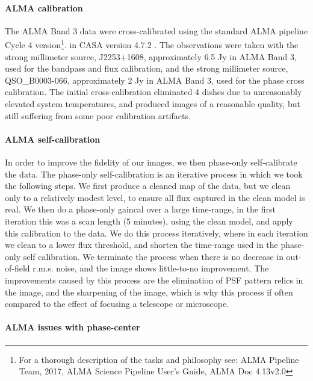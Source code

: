 \documentclass[twocolumn]{aastex62}
\begin{document}
\paragraph{ALMA calibration} The ALMA Band 3 data were cross-calibrated using the standard ALMA pipeline Cycle 4 version\footnote{For a thorough description of the tasks and philosophy see: ALMA Pipeline Team, 2017, ALMA Science Pipeline User’s Guide, ALMA Doc 4.13v2.0}. in CASA version 4.7.2 \citep{casa}. The observations were taken with the strong millimeter source, J2253+1608, approximately 6.5 Jy in ALMA Band 3, used for the bandpass and flux calibration, and the strong millimeter source, QSO\_B0003-066, approximately 2 Jy in ALMA Band 3, used for the phase cross calibration. The initial cross-calibration eliminated 4 dishes due to unreasonably elevated system temperatures, and produced images of a reasonable quality, but still suffering from some poor calibration artifacts.

\paragraph{ALMA self-calibration} In order to improve the fidelity of our images, we then phase-only self-calibrate the data. The phase-only self-calibration is an iterative process in which we took the following steps. We first produce a cleaned map of the data, but we clean only to a relatively modest level, to ensure all flux captured in the clean model is real. We then do a phase-only gaincal over a large time-range, in the first iteration this was a scan length (5 minutes), using the clean model, and apply this calibration to the data. We do this process iteratively, where in each iteration we clean to a lower flux threshold, and shorten the time-range used in the phase-only self calibration. We terminate the process when there is no decrease in out-of-field r.m.s. noise, and the image shows little-to-no improvement. The improvements caused by this process are the elimination of PSF pattern relics in the image, and the sharpening of the image, which is why this process if often compared to the effect of focusing a telescope or microscope. 

\paragraph{ALMA issues with phase-center}
\end{document}
